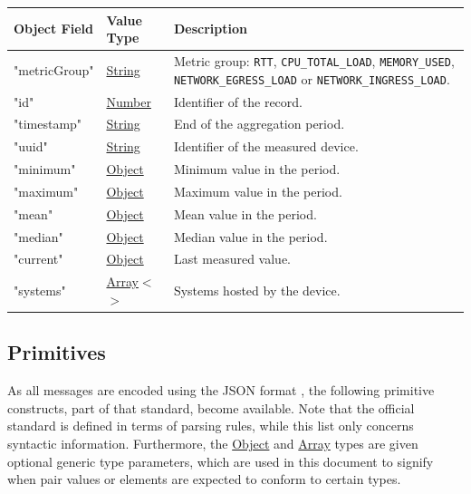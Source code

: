 \documentclass[a4paper]{arrowhead}
\newcommand{\pref}[1]{{\textcolor{ArrowheadGrey}{\hyperref[sec:model:primitives:#1]{#1}}}}
\begin{document}
\noindent\begin{tabularx}{\textwidth}{| >{\raggedright\arraybackslash}p{3.9cm} | >{\raggedright\arraybackslash\small}p{5.3cm} | X |} \hline
\rowcolor{gray!33} Object Field & Value Type & Description \\ \hline
"metric\allowbreak{}Group" & \pref{String} & Metric group: \texttt{RTT}, \texttt{CPU\_\allowbreak{}TOTAL\_\allowbreak{}LOAD}, \texttt{MEMORY\_\allowbreak{}USED}, \texttt{NETWORK\_\allowbreak{}EGRESS\_\allowbreak{}LOAD} or \texttt{NETWORK\_\allowbreak{}INGRESS\_\allowbreak{}LOAD}. \\ \hline
"id" & \pref{Number} & Identifier of the record. \\ \hline
"timestamp" & \pref{String} & End of the aggregation period. \\ \hline
"uuid" & \pref{String} & Identifier of the measured device. \\ \hline
"minimum" & \pref{Object} & Minimum value in the period. \\ \hline
"maximum" & \pref{Object} & Maximum value in the period. \\ \hline
"mean" & \pref{Object} & Mean value in the period. \\ \hline
"median" & \pref{Object} & Median value in the period. \\ \hline
"current" & \pref{Object} & Last measured value. \\ \hline
"systems" & \pref{Array}$<$\allowbreak{}\pref{String}$>$ & Systems hosted by the device. \\ \hline
\end{tabularx}



\subsection{Primitives}
\label{sec:model:primitives}

As all messages are encoded using the JSON format \cite{rfc8259}, the following primitive constructs, part of that standard, become available.
Note that the official standard is defined in terms of parsing rules, while this list only concerns syntactic information.
Furthermore, the \pref{Object} and \pref{Array} types are given optional generic type parameters, which are used in this document to signify when pair values or elements are expected to conform to certain types.
\end{document}
